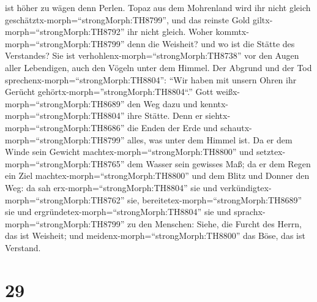 ist höher zu wägen denn Perlen.  Topaz aus dem Mohrenland
wird ihr nicht gleich geschätztx-morph=``strongMorph:TH8799'', und das
reinste Gold giltx-morph=``strongMorph:TH8792'' ihr nicht gleich.
 Woher kommtx-morph=``strongMorph:TH8799'' denn die
Weisheit? und wo ist die Stätte des Verstandes?  Sie ist
verhohlenx-morph=``strongMorph:TH8738'' vor den Augen aller Lebendigen,
auch den Vögeln unter dem Himmel.  Der Abgrund und der Tod
sprechenx-morph=``strongMorph:TH8804'': ``Wir haben mit unsern Ohren ihr
Gerücht gehörtx-morph=''strongMorph:TH8804``.''  Gott
weißx-morph=``strongMorph:TH8689'' den Weg dazu und
kenntx-morph=``strongMorph:TH8804'' ihre Stätte.  Denn er
siehtx-morph=``strongMorph:TH8686'' die Enden der Erde und
schautx-morph=``strongMorph:TH8799'' alles, was unter dem Himmel ist.
 Da er dem Winde sein Gewicht
machtex-morph=``strongMorph:TH8800'' und
setztex-morph=``strongMorph:TH8765'' dem Wasser sein gewisses Maß;
 da er dem Regen ein Ziel
machtex-morph=``strongMorph:TH8800'' und dem Blitz und Donner den Weg:
 da sah erx-morph=``strongMorph:TH8804'' sie und
verkündigtex-morph=``strongMorph:TH8762'' sie,
bereitetex-morph=``strongMorph:TH8689'' sie und
ergründetex-morph=``strongMorph:TH8804'' sie  und
sprachx-morph=``strongMorph:TH8799'' zu den Menschen: Siehe, die Furcht
des Herrn, das ist Weisheit; und meidenx-morph=``strongMorph:TH8800''
das Böse, das ist Verstand.

\hypertarget{section-28}{%
\section{29}\label{section-28}}

